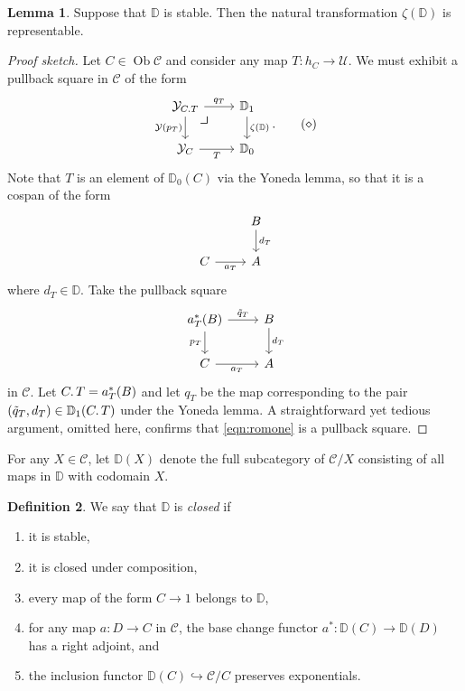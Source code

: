 \documentclass[10pt,letterpaper,cm]{nupset}
\theoremstyle{definition}
\newtheorem{definition}{Definition}[subsection]
\theoremstyle{theorem}
\newtheorem{lemma}[definition]{Lemma}
\theoremstyle{remark}
\DeclareMathOperator{\ob}{Ob}
\newcommand{\0}{\mathbf{0}}
\newcommand{\1}{\mathbf{1}}
\newcommand{\2}{\mathbf{2}}
\renewcommand{\c}{\mathscr{C}}
\newcommand{\be}{\begin{enumerate}}
\newcommand{\ee}{\end{enumerate}}
\begin{document}
\begin{lemma}
Suppose that $\mathbb{D}$ is stable. Then the natural transformation $\zeta(\mathbb{D})$ is representable.
\end{lemma}
\begin{proof}[Proof sketch]
Let $C\in \ob{\c}$ and consider any map $T: h_C \to \mathcal{U}$. We must exhibit a pullback square in $\widehat{\c}$ of the form
\[ \label{eqn:romone}
\begin{tikzcd}
\mathcal{Y}_{C\ldotp{T}} \arrow[d, "\mathcal{Y}(p_T)"'] \arrow[r, "q_T"]  \arrow[dr, phantom, "\scalebox{1.5}{\color{black}$\lrcorner$}" , very near start, color=black] & \mathbb{D}_1 \arrow[d, "\zeta(\mathbb{D})"] \\
\mathcal{Y}_C \arrow[r, "T"']                                                & \mathbb{D}_0                               
\end{tikzcd}
. \tag{$\diamond$}
\] Note that $T$ is an element of $\mathbb{D}_0(C)$ via the Yoneda lemma, so that it is a cospan of the form
\[
\begin{tikzcd}
                  & B \arrow[d, "d_T"] \\
C \arrow[r, "a_T"'] & A               
\end{tikzcd}
\] where $d_T\in \mathbb{D}$. Take the pullback square
\[
\begin{tikzcd}
a_T^{\ast}(B) \arrow[d, "{p}_T"'] \arrow[r, "\tilde{q}_T"] & B \arrow[d, "d_T"] \\
C \arrow[r, "a_T"']                                      & A                 
\end{tikzcd}
\]
in $\c$. Let $C\ldotp{T} = a_T^{\ast}(B)$ and let $q_T$ be the map corresponding to the pair $\mleft(\tilde{q}_T,  d_T\mright) \in \mathbb{D}_1(C\ldotp{T})$ under the Yoneda lemma. A straightforward yet tedious argument, omitted here, confirms that \eqref{eqn:romone} is a pullback square.
\end{proof}

\medskip

For any $X\in \c$, let $\mathbb{D}(X)$ denote the full subcategory of $\c/X$ consisting of all maps in $\mathbb{D}$ with codomain $X$.

\begin{definition}\label{closedmaps}
We say that $\mathbb{D}$ is \textit{closed} if 
\be[label=(\alph*)]
\item it is stable,
\item it is closed under composition,
\item every map of the form $C \to 1$ belongs to $\mathbb{D}$,
\item for any map $a: D \to C$ in $\c$, the base change functor $a^{\ast} : \mathbb{D}(C)\to \mathbb{D}(D)$ has a right adjoint, and
\item the inclusion functor $\mathbb{D}(C) \hookrightarrow \c/C$ preserves exponentials.  
\ee
\end{definition}
\end{document}
